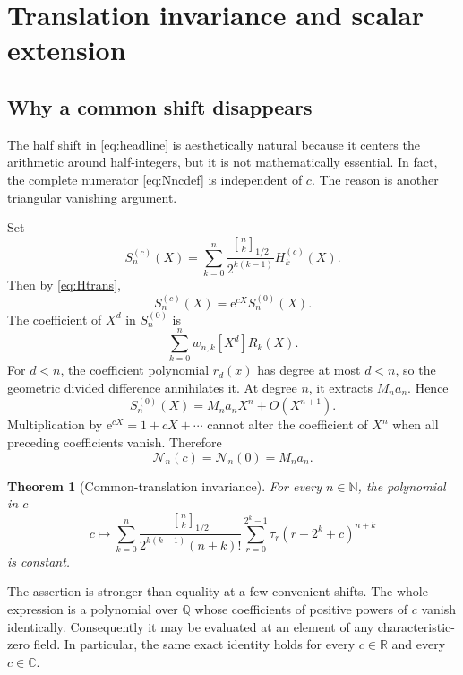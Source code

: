 \documentclass[11pt,oneside]{article}
\newtheorem{theorem}{Theorem}[section]
\theoremstyle{definition}
\theoremstyle{remark}
\newcommand{\halfqbinom}[2]{{\genfrac{[}{]}{0pt}{}{#1}{#2}}_{1/2}}
\newcommand{\coeff}[2]{\left[#1^{#2}\right]}
\newcommand{\N}{\mathbb N}
\newcommand{\Q}{\mathbb Q}
\newcommand{\R}{\mathbb R}
\newcommand{\C}{\mathbb C}
\newcommand{\e}{\mathrm e}
\newcommand{\tm}{\tau}
\begin{document}
\section{Translation invariance and scalar extension}\label{sec:translation}

\subsection{Why a common shift disappears}

The half shift in \eqref{eq:headline} is aesthetically natural because it
centers the arithmetic around half-integers, but it is not mathematically
essential.  In fact, the complete numerator \eqref{eq:Nncdef} is independent
of $c$.  The reason is another triangular vanishing argument.

Set
\begin{equation}\label{eq:Snc}
 S_n^{(c)}(X)=
 \sum_{k=0}^{n}
 \frac{\halfqbinom{n}{k}}{2^{k(k-1)}}H_k^{(c)}(X).
\end{equation}
Then by \eqref{eq:Htrans},
\begin{equation}\label{eq:Sntranslate}
 S_n^{(c)}(X)=\e^{cX}S_n^{(0)}(X).
\end{equation}
The coefficient of $X^d$ in $S_n^{(0)}$ is
\[
 \sum_{k=0}^{n}w_{n,k}\coeff{X}{d}R_k(X).
\]
For $d<n$, the coefficient polynomial $r_d(x)$ has degree at most $d<n$,
so the geometric divided difference annihilates it.  At degree $n$, it
extracts $M_na_n$.  Hence
\begin{equation}\label{eq:Snorder}
 S_n^{(0)}(X)=M_na_nX^n+O(X^{n+1}).
\end{equation}
Multiplication by $\e^{cX}=1+cX+\cdots$ cannot alter the coefficient of
$X^n$ when all preceding coefficients vanish.  Therefore
\begin{equation}\label{eq:Nconstant}
 \boxed{\mathcal N_n(c)=\mathcal N_n(0)=M_na_n.}
\end{equation}

\begin{theorem}[Common-translation invariance]
For every $n\in\N$, the polynomial in $c$
\[
 c\longmapsto
 \sum_{k=0}^{n}
 \frac{\halfqbinom{n}{k}}
      {2^{k(k-1)}(n+k)!}
 \sum_{r=0}^{2^k-1}\tm_r(r-2^k+c)^{n+k}
\]
is constant.
\end{theorem}

The assertion is stronger than equality at a few convenient shifts.  The
whole expression is a polynomial over $\Q$ whose coefficients of positive
powers of $c$ vanish identically.  Consequently it may be evaluated at an
element of any characteristic-zero field.  In particular, the same exact
identity holds for every $c\in\R$ and every $c\in\C$.
\end{document}
